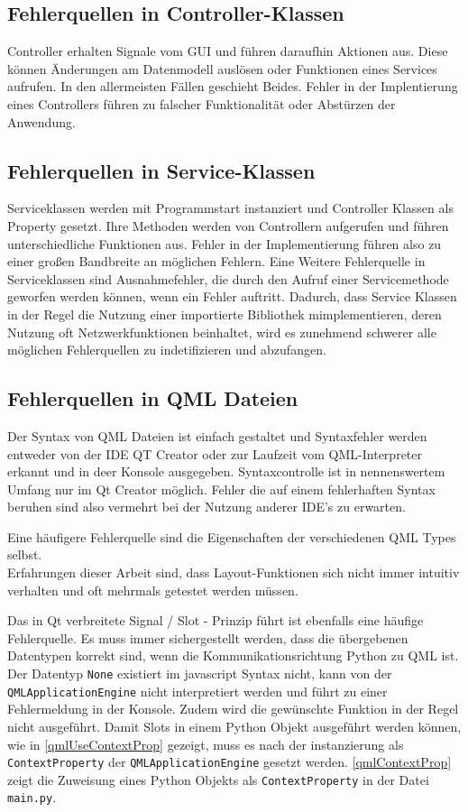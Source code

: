 \subsection{Fehlerquellen in Controller-Klassen}

Controller erhalten Signale vom GUI und führen daraufhin Aktionen aus. 
Diese können Änderungen am Datenmodell auslösen oder Funktionen eines Services aufrufen. 
In den allermeisten Fällen geschieht Beides.
Fehler in der Implentierung eines Controllers führen zu falscher Funktionalität oder Abstürzen der Anwendung.

\subsection{Fehlerquellen in Service-Klassen}

Serviceklassen werden mit Programmstart instanziert und Controller Klassen als Property gesetzt. 
Ihre Methoden werden von Controllern aufgerufen und führen unterschiedliche Funktionen aus. 
Fehler in der Implementierung führen also zu einer großen Bandbreite an möglichen Fehlern. 
Eine Weitere Fehlerquelle in Serviceklassen sind Ausnahmefehler, die durch den Aufruf einer Servicemethode geworfen werden können, 
wenn ein Fehler auftritt. 
Dadurch, dass Service Klassen in der Regel die Nutzung einer importierte Bibliothek mimplementieren, deren Nutzung oft Netzwerkfunktionen beinhaltet,
wird es zunehmend schwerer alle möglichen Fehlerquellen zu indetifizieren und abzufangen. 


\subsection{Fehlerquellen in QML Dateien}

Der Syntax von QML Dateien ist einfach gestaltet und Syntaxfehler werden entweder von der IDE QT Creator oder zur Laufzeit vom QML-Interpreter
erkannt und in deer Konsole ausgegeben. Syntaxcontrolle ist in nennenswertem Umfang nur im Qt Creator möglich. Fehler die auf einem 
fehlerhaften Syntax beruhen sind also vermehrt bei der Nutzung anderer IDE's zu erwarten. 

Eine häufigere Fehlerquelle sind die Eigenschaften der verschiedenen QML Types selbst. \\
Erfahrungen dieser Arbeit sind, dass Layout-Funktionen sich nicht immer intuitiv verhalten und oft mehrmals getestet werden müssen. 

Das in Qt verbreitete Signal / Slot - Prinzip führt ist ebenfalls eine häufige Fehlerquelle. 
Es muss immer sichergestellt werden, dass die übergebenen Datentypen korrekt sind, wenn die Kommunikationsrichtung 
Python zu QML ist. Der Datentyp \verb|None| existiert im javascript Syntax nicht, kann von der \verb|QMLApplicationEngine|
nicht interpretiert werden und führt zu einer Fehlermeldung in der Konsole. 
Zudem wird die gewünschte Funktion in der Regel nicht ausgeführt.
Damit Slots in einem Python Objekt ausgeführt werden können, wie in \ref{qmlUseContextProp} gezeigt, muss es nach der instanzierung als \verb|ContextProperty| der 
\verb|QMLApplicationEngine| gesetzt werden.
\ref{qmlContextProp} zeigt die Zuweisung eines Python Objekts als \verb|ContextProperty| in der Datei \verb|main.py|.

